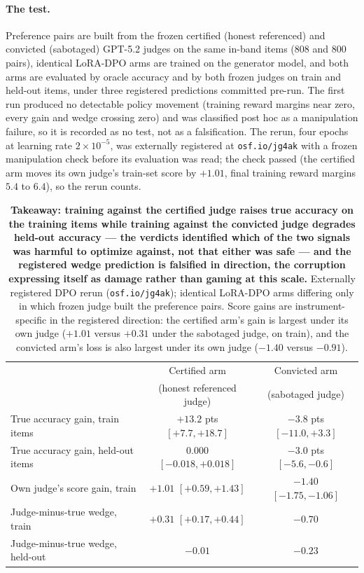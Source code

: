 \documentclass[11pt]{article}
\begin{document}
\paragraph{The test.}
Preference pairs are built from the frozen certified (honest referenced) and convicted (sabotaged) GPT-5.2 judges on the same in-band items (808 and 800 pairs), identical LoRA-DPO arms are trained on the generator model, and both arms are evaluated by oracle accuracy and by both frozen judges on train and held-out items, under three registered predictions committed pre-run.
The first run produced no detectable policy movement (training reward margins near zero, every gain and wedge crossing zero) and was classified post hoc as a manipulation failure, so it is recorded as no test, not as a falsification.
The rerun, four epochs at learning rate $2 \times 10^{-5}$, was externally registered at \texttt{osf.io/jg4ak} with a frozen manipulation check before its evaluation was read; the check passed (the certified arm moves its own judge's train-set score by $+1.01$, final training reward margins $5.4$ to $6.4$), so the rerun counts.

\begin{table}[tbp]
\centering
\small
\setlength{\tabcolsep}{5pt}
\begin{tabular}{lcc}
\toprule
& Certified arm & Convicted arm \\
& (honest referenced judge) & (sabotaged judge) \\
\midrule
True accuracy gain, train items & $\mathbf{+13.2}$ pts {\scriptsize$[+7.7, +18.7]$} & $-3.8$ pts {\scriptsize$[-11.0, +3.3]$} \\
True accuracy gain, held-out items & $0.000$ {\scriptsize$[-0.018, +0.018]$} & $\mathbf{-3.0}$ pts {\scriptsize$[-5.6, -0.6]$} \\
Own judge's score gain, train & $+1.01$ {\scriptsize$[+0.59, +1.43]$} & $-1.40$ {\scriptsize$[-1.75, -1.06]$} \\
Judge-minus-true wedge, train & $+0.31$ {\scriptsize$[+0.17, +0.44]$} & $-0.70$ \\
Judge-minus-true wedge, held-out & $-0.01$ & $-0.23$ \\
\bottomrule
\end{tabular}
\caption{\textbf{Takeaway: training against the certified judge raises true accuracy on the training items while training against the convicted judge degrades held-out accuracy --- the verdicts identified which of the two signals was harmful to optimize against, not that either was safe --- and the registered wedge prediction is falsified in direction, the corruption expressing itself as damage rather than gaming at this scale.}
Externally registered DPO rerun (\texttt{osf.io/jg4ak}); identical LoRA-DPO arms differing only in which frozen judge built the preference pairs.
Score gains are instrument-specific in the registered direction: the certified arm's gain is largest under its own judge ($+1.01$ versus $+0.31$ under the sabotaged judge, on train), and the convicted arm's loss is also largest under its own judge ($-1.40$ versus $-0.91$).}
\label{tab:dpo}
\end{table}
\end{document}
